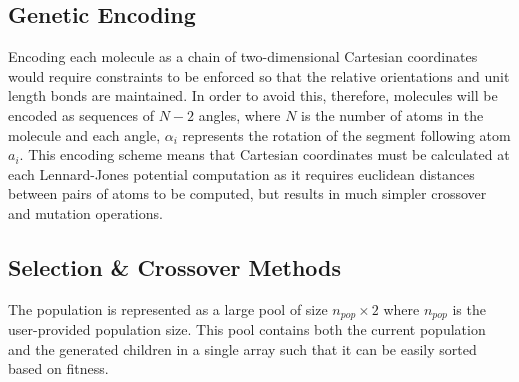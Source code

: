 \documentclass{article}
\begin{document}
\subsection{Genetic Encoding}

Encoding each  molecule as a chain of two-dimensional Cartesian coordinates
would require constraints to be enforced so that the relative orientations and
unit length bonds are maintained. In order to avoid this, therefore, molecules
will be encoded as sequences of $N-2$ angles, where $N$ is the number of atoms
in the molecule and each angle, $\alpha_i$ represents the rotation of the
segment following atom $a_i$. This encoding scheme means that Cartesian
coordinates must be calculated at each Lennard-Jones potential computation as it
requires euclidean distances between pairs of atoms to be computed, but results
in much simpler crossover and mutation operations.

\subsection{Selection \& Crossover Methods}



The population is represented as a large pool of size $n_{pop} \times 2$ where
$n_{pop}$ is the user-provided population size. This pool contains both the
current population and the generated children in a single array such that it
can be easily sorted based on fitness.

\end{document}
